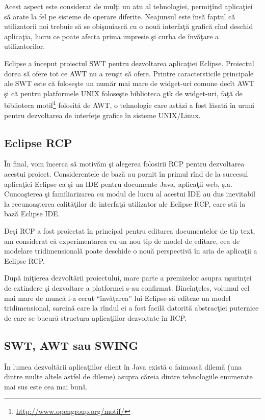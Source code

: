Acest aspect este considerat de mulţi un atu al tehnologiei, permiţînd 
aplicaţiei să arate la fel pe sisteme de operare diferite. Neajunsul este însă 
faptul că utilizatorii noi trebuie să se obişnuiască cu o nouă interfaţă 
grafică cînd deschid aplicaţia, lucru ce poate afecta prima impresie şi curba 
de învăţare a utilizatorilor.

Eclipse a început proiectul SWT pentru dezvoltarea aplicaţiei Eclipse. 
Proiectul dorea să ofere tot ce AWT nu a reuşit să ofere. Printre 
caractersticile principale ale SWT este că foloseşte un număr mai mare de 
widget-uri comune decît AWT şi că pentru platformele UNIX foloseşte biblioteca 
gtk de widget-uri, faţă de biblioteca 
motif\footnote{\url{http://www.opengroup.org/motif/}} folosită de AWT, o 
tehnologie care astăzi a fost lăsată în urmă pentru dezvoltarea de interfeţe 
grafice în sisteme UNIX/Linux.
\subsection{Eclipse RCP}

În final, vom încerca să motivăm şi alegerea folosirii RCP pentru dezvoltarea 
acestui proiect. Considerentele de bază au pornit în primul rînd de la succesul 
aplicaţiei Eclipse ca şi un IDE pentru documente Java, aplicaţii web, ş.a. 
Cunoaşterea şi familiarizarea cu modul de lucru al acestui IDE au dus 
inevitabil la recunoaşterea calităţilor de interfaţă utilizator ale Eclipse 
RCP, care stă la bază Eclipse IDE.

Deşi RCP a fost proiectat în principal pentru editarea documentelor de tip 
text, am considerat că experimentarea cu un nou tip de model de editare, cea de 
modelare tridimensională poate deschide o nouă perspectivă în aria de aplicaţii 
a Eclipse RCP.

După iniţierea dezvoltării proiectului, mare parte a premizelor asupra 
uşurinţei de extindere şi dezvoltare a platformei s-au confirmat. Bineînţeles, 
volumul cel mai mare de muncă l-a cerut ``învăţarea'' lui Eclipse să editeze un 
model tridimensional, sarcină care la rîndul ei a fost facilă datorită 
abstracţiei puternice de care se bucură structura aplicaţiilor dezvoltate în 
RCP.

\subsection{SWT, AWT sau SWING}

În lumea dezvoltării aplicaţiilor client în Java există o faimoasă dilemă (una
dintre multe altele astfel de dileme) asupra căreia dintre tehnologiile
enumerate mai sus este cea mai bună.


